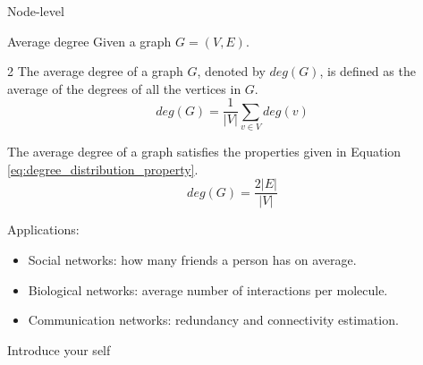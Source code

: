 \documentclass{beamer}
\begin{document}
    \begin{frame}{Node-level}
        \begin{exampleblock}{Average degree}
            Given a graph $G = (V, E)$. \newline
            
            \begin{multicols}{2} %
                The average degree of a graph $G$, denoted by $deg(G)$, is defined as the average of the degrees of all the vertices in $G$.
                \begin{equation}
                    deg(G) = \frac{1}{|V|}\sum_{v \in V}deg(v)
                    \label{eq:degree_distribution}
                \end{equation}
        
                The average degree of a graph satisfies the properties given in Equation \ref{eq:degree_distribution_property}.
                \begin{equation}
                    deg(G) = \frac{2|E|}{|V|}
                    \label{eq:degree_distribution_property}
                \end{equation}
            \end{multicols}
        \end{exampleblock}
        \vspace{-5mm}

        Applications:
        \begin{itemize}
            \item Social networks: how many friends a person has on average.
            \item Biological networks: average number of interactions per molecule.
            \item Communication networks: redundancy and connectivity estimation.
        \end{itemize}

        \begin{note}
            {Introduce your self}
        \end{note}
    \end{frame}
\end{document}
